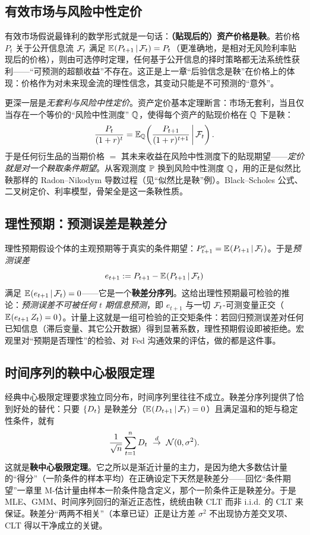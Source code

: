\subsection{有效市场与风险中性定价}

有效市场假说最锋利的数学形式就是一句话：\textbf{（贴现后的）资产价格是鞅}。若价格 $P_t$ 关于公开信息流 $\cF_t$ 满足 $\E{P_{t+1}\given\cF_t}=P_t$（更准确地，是相对无风险利率贴现后的价格），则由可选停时定理，任何基于公开信息的择时策略都无法系统性获利——``可预测的超额收益''不存在。这正是上一章``后验信念是鞅''在价格上的体现：价格作为对未来现金流的理性信念，其变动只能是不可预测的``意外''。

更深一层是\emph{无套利与风险中性定价}。资产定价基本定理断言：市场无套利，当且仅当存在一个等价的``风险中性测度'' $\QQ$，使得每个资产的贴现价格在 $\QQ$ 下是鞅：
\[
    \frac{P_t}{(1+r)^t}=\E[\QQ]{\frac{P_{t+1}}{(1+r)^{t+1}}\given\cF_t} .
\]
于是任何衍生品的当期价格 $=$ 其未来收益在风险中性测度下的贴现期望——\emph{定价就是对一个鞅取条件期望}。从客观测度 $\PP$ 换到风险中性测度 $\QQ$，用的正是似然比鞅那样的 Radon--Nikodym 导数过程（见``似然比是鞅''例）。Black--Scholes 公式、二叉树定价、利率模型，骨架全是这一条鞅性质。

\subsection{理性预期：预测误差是鞅差分}

理性预期假设个体的主观预期等于真实的条件期望：$P^e_{t+1}=\E{P_{t+1}\given\cF_t}$。于是\emph{预测误差}
\[
    e_{t+1}:=P_{t+1}-\E{P_{t+1}\given\cF_t}
\]
满足 $\E{e_{t+1}\given\cF_t}=0$——它是一个\textbf{鞅差分序列}。这给出理性预期最可检验的推论：\emph{预测误差不可被任何 $t$ 期信息预测}，即 $e_{t+1}$ 与一切 $\cF_t$-可测变量正交（$\E{e_{t+1}\,Z_t}=0$）。计量上这就是一组可检验的正交矩条件：若回归预测误差对任何已知信息（滞后变量、其它公开数据）得到显著系数，理性预期假设即被拒绝。宏观里对``预期是否理性''的检验、对 Fed 沟通效果的评估，做的都是这件事。

\subsection{时间序列的鞅中心极限定理}

经典中心极限定理要求独立同分布，时间序列里往往不成立。鞅差分序列提供了恰到好处的替代：只要 $\set{D_t}$ 是鞅差分（$\E{D_{t+1}\given\cF_t}=0$）且满足温和的矩与稳定性条件，就有
\[
    \frac{1}{\rtn}\sum_{t=1}^{n}D_t\ \dto\ \cN(0,\sigma^2) .
\]
这就是\textbf{鞅中心极限定理}。它之所以是渐近计量的主力，是因为绝大多数估计量的``得分''（一阶条件的样本平均）在正确设定下天然是鞅差分——回忆``条件期望''一章里 M-估计量由样本一阶条件隐含定义，那个一阶条件正是鞅差分。于是 MLE、GMM、时间序列回归的渐近正态性，统统由鞅 CLT 而非 i.i.d.\ 的 CLT 来保证。鞅差分``两两不相关''（本章已证）正是让方差 $\sigma^2$ 不出现协方差交叉项、CLT 得以干净成立的关键。

